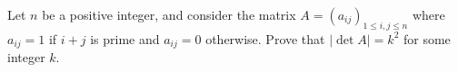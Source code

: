Let $ n$ be a positive integer, and consider the matrix $ A = (a_{ij})_{1\leq i,j\leq n}$ where $ a_{ij} = 1$ if $ i+j$ is prime and $ a_{ij} = 0$ otherwise.
Prove that $ |\det A| = k^2$ for some integer $ k$.